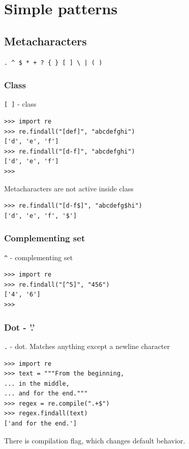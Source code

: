 \documentclass{beamer}
\begin{document}
\section{Simple patterns}
\subsection{Metacharacters}
\begin{frame}[fragile]
\begin{verbatim}
. ^ $ * + ? { } [ ] \ | ( )
\end{verbatim}
\end{frame}

\subsubsection{Class}
\begin{frame}[fragile]
\verb/[ ]/ - class
\begin{lstlisting}
>>> import re
>>> re.findall("[def]", "abcdefghi")
['d', 'e', 'f']
>>> re.findall("[d-f]", "abcdefghi")
['d', 'e', 'f']
>>>
\end{lstlisting}
\pause
Metacharacters are not active inside class \\
\begin{lstlisting}
>>> re.findall("[d-f$]", "abcdefg$hi")
['d', 'e', 'f', '$']
\end{lstlisting}
\end{frame}

\subsubsection{Complementing set}
\begin{frame}[fragile]
\verb/^/ - complementing set
\begin{lstlisting}
>>> import re
>>> re.findall("[^5]", "456")
['4', '6']
>>>
\end{lstlisting}
\end{frame}

\subsubsection{Dot - '.'}
\begin{frame}[fragile]
\verb/./ - dot. Matches anything except a newline character
\begin{lstlisting}
>>> import re
>>> text = """From the beginning,
... in the middle,
... and for the end."""
>>> regex = re.compile(".+$")
>>> regex.findall(text)
['and for the end.']
\end{lstlisting}
\pause
There is compilation flag, which changes default behavior.
\end{frame}
\end{document}
